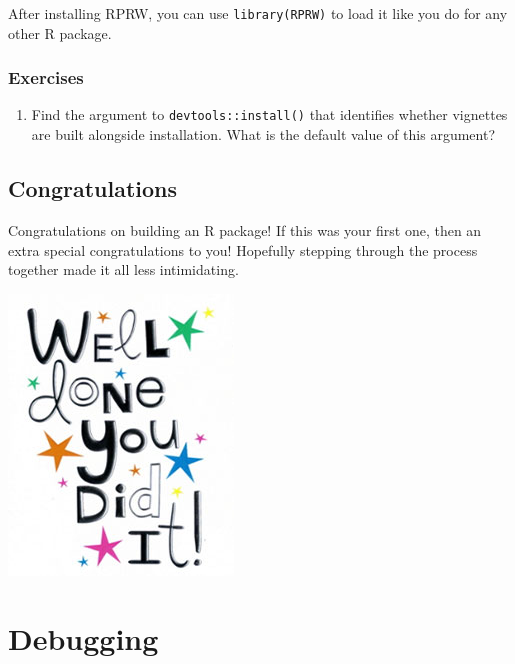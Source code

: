 \documentclass[
]{book}
\providecommand{\tightlist}{%
  \setlength{\itemsep}{0pt}\setlength{\parskip}{0pt}}
\begin{document}
After installing RPRW, you can use \texttt{library(RPRW)} to load it like you do for any other R package.

\hypertarget{ex-set5}{%
\subsubsection{Exercises}\label{ex-set5}}

\begin{enumerate}
\def\labelenumi{\arabic{enumi}.}
\tightlist
\item
  Find the argument to \texttt{devtools::install()} that identifies whether vignettes are built alongside installation. What is the default value of this argument?
\end{enumerate}

\hypertarget{congratulations}{%
\subsection{Congratulations}\label{congratulations}}

Congratulations on building an R package! If this was your first one, then an extra special congratulations to you! Hopefully stepping through the process together made it all less intimidating.

\begin{center}\includegraphics[width=0.5\linewidth]{images/well_done} \end{center}

\hypertarget{debugging}{%
\section{Debugging}\label{debugging}}
\end{document}
